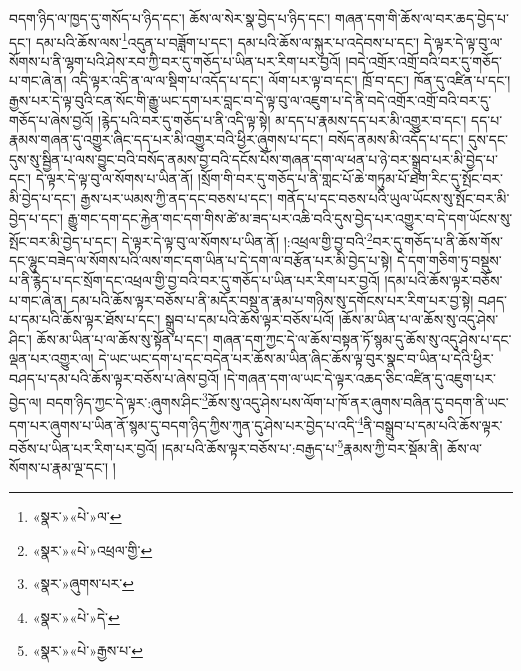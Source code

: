 བདག་ཉིད་ལ་ཁྱད་དུ་གསོད་པ་ཉིད་དང་། ཆོས་ལ་སེར་སྣ་བྱེད་པ་ཉིད་དང་། གཞན་དག་གི་ཆོས་ལ་བར་ཆད་བྱེད་པ་དང་། དམ་པའི་ཆོས་ལས་\footnote{«སྣར་»«པེ་»ལ་}འདུན་པ་བཟློག་པ་དང་། དམ་པའི་ཆོས་ལ་སྐུར་པ་འདེབས་པ་དང་། དེ་ལྟར་དེ་ལྟ་བུ་ལ་སོགས་པ་ནི་ལྷག་པའི་ཤེས་རབ་ཀྱི་བར་དུ་གཅོད་པ་ཡིན་པར་རིག་པར་བྱའོ། །བདེ་འགྲོར་འགྲོ་བའི་བར་དུ་གཅོད་པ་གང་ཞེ་ན། འདི་ལྟར་འདི་ན་ལ་ལ་སྡིག་པ་འདོད་པ་དང་། ལོག་པར་ལྟ་བ་དང་། ཁྲོ་བ་དང་། ཁོན་དུ་འཛིན་པ་དང་། རྒྱས་པར་དེ་ལྟ་བུའི་ངན་སོང་གི་རྒྱུ་ཡང་དག་པར་བླང་བ་དེ་ལྟ་བུ་ལ་འཇུག་པ་དེ་ནི་བདེ་འགྲོར་འགྲོ་བའི་བར་དུ་གཅོད་པ་ཞེས་བྱའོ། །རྙེད་པའི་བར་དུ་གཅོད་པ་ནི་འདི་ལྟ་སྟེ། མ་དད་པ་རྣམས་དད་པར་མི་འགྱུར་བ་དང་། དད་པ་རྣམས་གཞན་དུ་འགྱུར་ཞིང་དད་པར་མི་འགྱུར་བའི་ཕྱིར་ཞུགས་པ་དང་། བསོད་ནམས་མི་འདོད་པ་དང་། དུས་དང་དུས་སུ་སྦྱིན་པ་ལས་བྱུང་བའི་བསོད་ནམས་བྱ་བའི་དངོས་པོས་གཞན་དག་ལ་ཕན་པ་ཉེ་བར་སྒྲུབ་པར་མི་བྱེད་པ་དང་། དེ་ལྟར་དེ་ལྟ་བུ་ལ་སོགས་པ་ཡིན་ནོ། །སྲོག་གི་བར་དུ་གཅོད་པ་ནི་གླང་པོ་ཆེ་གཏུམ་པོ་ཐག་རིང་དུ་སྤོང་བར་མི་བྱེད་པ་དང་། རྒྱས་པར་ཡམས་ཀྱི་ནད་དང་བཅས་པ་དང་། གནོད་པ་དང་བཅས་པའི་ཡུལ་ཡོངས་སུ་སྤོང་བར་མི་བྱེད་པ་དང་། རྒྱུ་གང་དག་དང་རྐྱེན་གང་དག་གིས་ཚེ་མ་ཟད་པར་འཆི་བའི་དུས་བྱེད་པར་འགྱུར་བ་དེ་དག་ཡོངས་སུ་སྤོང་བར་མི་བྱེད་པ་དང་། དེ་ལྟར་དེ་ལྟ་བུ་ལ་སོགས་པ་ཡིན་ནོ། །:འཕྲལ་གྱི་བྱ་བའི་\footnote{«སྣར་»«པེ་»འཕྲལ་གྱི་}བར་དུ་གཅོད་པ་ནི་ཆོས་གོས་དང་ལྷུང་བཟེད་ལ་སོགས་པའི་ལས་གང་དག་ཡིན་པ་དེ་དག་ལ་བརྩོན་པར་མི་བྱེད་པ་སྟེ། དེ་དག་གཅིག་ཏུ་བསྡུས་པ་ནི་རྙེད་པ་དང་སྲོག་དང་འཕྲལ་གྱི་བྱ་བའི་བར་དུ་གཅོད་པ་ཡིན་པར་རིག་པར་བྱའོ། །དམ་པའི་ཆོས་ལྟར་བཅོས་པ་གང་ཞེ་ན། དམ་པའི་ཆོས་ལྟར་བཅོས་པ་ནི་མདོར་བསྡུ་ན་རྣམ་པ་གཉིས་སུ་དགོངས་པར་རིག་པར་བྱ་སྟེ། བཤད་པ་དམ་པའི་ཆོས་ལྟར་ཐོས་པ་དང་། སྒྲུབ་པ་དམ་པའི་ཆོས་ལྟར་བཅོས་པའོ། །ཆོས་མ་ཡིན་པ་ལ་ཆོས་སུ་འདུ་ཤེས་ཤིང་། ཆོས་མ་ཡིན་པ་ལ་ཆོས་སུ་སྟོན་པ་དང་། གཞན་དག་ཀྱང་དེ་ལ་ཆོས་བསྟན་ཏོ་སྙམ་དུ་ཆོས་སུ་འདུ་ཤེས་པ་དང་ལྡན་པར་འགྱུར་ལ། དེ་ཡང་ཡང་དག་པ་དང་བདེན་པར་ཆོས་མ་ཡིན་ཞིང་ཆོས་ལྟ་བུར་སྣང་བ་ཡིན་པ་དེའི་ཕྱིར་བཤད་པ་དམ་པའི་ཆོས་ལྟར་བཅོས་པ་ཞེས་བྱའོ། །དེ་གཞན་དག་ལ་ཡང་དེ་ལྟར་འཆད་ཅིང་འཛིན་དུ་འཇུག་པར་བྱེད་ལ། བདག་ཉིད་ཀྱང་དེ་ལྟར་:ཞུགས་ཤིང་\footnote{«སྣར་»ཞུགས་པར་}ཆོས་སུ་འདུ་ཤེས་པས་ལོག་པ་ཁོ་ནར་ཞུགས་བཞིན་དུ་བདག་ནི་ཡང་དག་པར་ཞུགས་པ་ཡིན་ནོ་སྙམ་དུ་བདག་ཉིད་ཀྱིས་ཀུན་དུ་ཤེས་པར་བྱེད་པ་འདི་\footnote{«སྣར་»«པེ་»དེ་}ནི་བསྒྲུབ་པ་དམ་པའི་ཆོས་ལྟར་བཅོས་པ་ཡིན་པར་རིག་པར་བྱའོ། །དམ་པའི་ཆོས་ལྟར་བཅོས་པ་:བརྒྱད་པ་\footnote{«སྣར་»«པེ་»རྒྱས་པ་}རྣམས་ཀྱི་བར་སྡོམ་ནི། ཆོས་ལ་སོགས་པ་རྣམ་ལྔ་དང་། །
